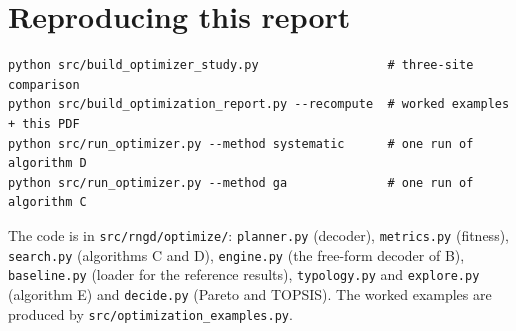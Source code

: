 \documentclass[10pt,a4paper]{article}
\newcommand{\code}[1]{\texttt{\small #1}}
\begin{document}
\section{Reproducing this report}
\begin{verbatim}
python src/build_optimizer_study.py                  # three-site comparison
python src/build_optimization_report.py --recompute  # worked examples + this PDF
python src/run_optimizer.py --method systematic      # one run of algorithm D
python src/run_optimizer.py --method ga              # one run of algorithm C
\end{verbatim}
The code is in \code{src/rngd/optimize/}: \code{planner.py} (decoder), \code{metrics.py} (fitness), \code{search.py}
(algorithms C and D), \code{engine.py} (the free-form decoder of B), \code{baseline.py} (loader for the reference
results), \code{typology.py} and \code{explore.py} (algorithm E) and \code{decide.py} (Pareto and TOPSIS). The worked
examples are produced by \code{src/optimization\_examples.py}.
\end{document}
